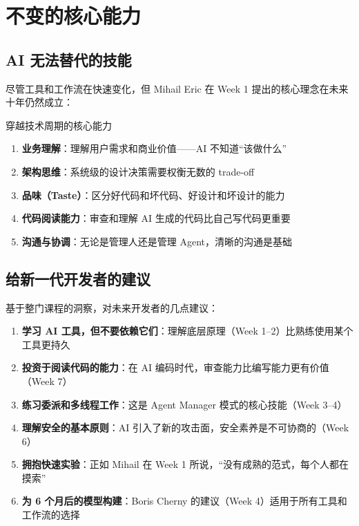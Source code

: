\section{不变的核心能力}

\subsection{AI 无法替代的技能}

尽管工具和工作流在快速变化，但 Mihail Eric 在 Week 1 提出的核心理念在未来十年仍然成立：

\begin{importantbox}{穿越技术周期的核心能力}
\begin{enumerate}
    \item \textbf{业务理解}：理解用户需求和商业价值——AI 不知道``该做什么''
    \item \textbf{架构思维}：系统级的设计决策需要权衡无数的 trade-off
    \item \textbf{品味（Taste）}：区分好代码和坏代码、好设计和坏设计的能力
    \item \textbf{代码阅读能力}：审查和理解 AI 生成的代码比自己写代码更重要
    \item \textbf{沟通与协调}：无论是管理人还是管理 Agent，清晰的沟通是基础
\end{enumerate}
\end{importantbox}

\subsection{给新一代开发者的建议}

基于整门课程的洞察，对未来开发者的几点建议：

\begin{enumerate}
    \item \textbf{学习 AI 工具，但不要依赖它们}：理解底层原理（Week 1--2）比熟练使用某个工具更持久
    \item \textbf{投资于阅读代码的能力}：在 AI 编码时代，审查能力比编写能力更有价值（Week 7）
    \item \textbf{练习委派和多线程工作}：这是 Agent Manager 模式的核心技能（Week 3--4）
    \item \textbf{理解安全的基本原则}：AI 引入了新的攻击面，安全素养是不可协商的（Week 6）
    \item \textbf{拥抱快速实验}：正如 Mihail 在 Week 1 所说，``没有成熟的范式，每个人都在摸索''
    \item \textbf{为 6 个月后的模型构建}：Boris Cherny 的建议（Week 4）适用于所有工具和工作流的选择
\end{enumerate}

